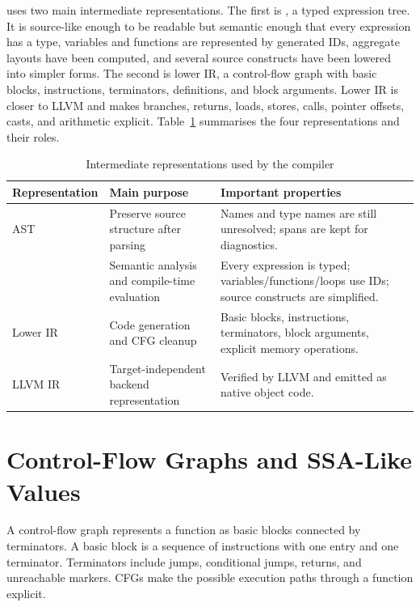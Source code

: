 \epl{} uses two main intermediate representations. The first is \irtree{}, a
typed expression tree. It is source-like enough to be readable but semantic
enough that every expression has a type, variables and functions are represented
by generated IDs, aggregate layouts have been computed, and several source
constructs have been lowered into simpler forms. The second is lower IR, a
control-flow graph with basic blocks, instructions, terminators, definitions,
and block arguments. Lower IR is closer to LLVM and makes branches, returns,
loads, stores, calls, pointer offsets, casts, and arithmetic explicit.
Table~\ref{tab:ir-summary} summarises the four representations and their roles.

\begin{table}[H]
  \centering
  \begin{tabular}{p{}p{}p{}}
    \toprule
    Representation & Main purpose & Important properties \\
    \midrule
    AST & Preserve source structure after parsing & Names and type names are still unresolved; spans are kept for diagnostics. \\
    \irtree{} & Semantic analysis and compile-time evaluation & Every expression is typed; variables/functions/loops use IDs; source constructs are simplified. \\
    Lower IR & Code generation and CFG cleanup & Basic blocks, instructions, terminators, block arguments, explicit memory operations. \\
    LLVM IR & Target-independent backend representation & Verified by LLVM and emitted as native object code. \\
    \bottomrule
  \end{tabular}
  \caption{Intermediate representations used by the \epl{} compiler}
  \label{tab:ir-summary}
\end{table}

\section{Control-Flow Graphs and SSA-Like Values}

A control-flow graph represents a function as basic blocks connected by
terminators. A basic block is a sequence of instructions with one entry and one
terminator. Terminators include jumps, conditional jumps, returns, and
unreachable markers. CFGs make the possible execution paths through a function
explicit.


